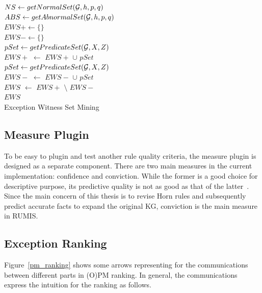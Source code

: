 \IncMargin{1.5em}
\begin{algorithm}[H]
\DontPrintSemicolon
\SetAlgoLined
{}
\BlankLine
$NS \leftarrow getNormalSet(\mathcal{G}, h, p, q)$\\
$ABS \leftarrow getAbnormalSet(\mathcal{G}, h, p, q)$\\
$EWS+ \leftarrow \{\}$\\
$EWS- \leftarrow \{\}$\\
\BlankLine
{} {
	$pSet \leftarrow getPredicateSet(\mathcal{G}, X, Z)$\\
	$EWS+$ $\leftarrow$ $EWS+$ $\cup$ $pSet$\\
}
 {
	$pSet \leftarrow getPredicateSet(\mathcal{G}, X, Z)$\\
	$EWS-$ $\leftarrow$ $EWS-$ $\cup$ $pSet$\\
}
$EWS$ $\leftarrow$ $EWS+$ $\setminus$ $EWS-$\\
\Return $EWS$\\
\caption{Exception Witness Set Mining}
\label{algo3}
\end{algorithm}
\DecMargin{1.5em}

\subsection{Measure Plugin}

To be easy to plugin and test another rule quality criteria, the measure plugin is designed as a separate component. There are two main measures in the current implementation: confidence and conviction. While the former is a good choice for descriptive purpose, its predictive quality is not as good as that of the latter~\cite{ref46}. Since the main concern of this thesis is to revise Horn rules and subsequently predict accurate facts to expand the original KG, conviction is the main measure in RUMIS.

\subsection{Exception Ranking}

Figure~\ref{pm_ranking} shows some arrows representing for the communications between different parts in (O)PM ranking. In general, the communications express the intuition for the ranking as follows.

